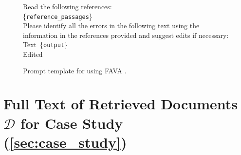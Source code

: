 \begin{figure}[htb!]
    \centering
    \begin{tcolorbox}[colback=gray!10, colframe=black, title=Prompt template for FAVA]
        Read the following references:\\
        \{\texttt{reference\_passages}\} \\
        Please identify all the errors in the following text using the information in the references provided and suggest edits if necessary:\\
        \lbrack Text\rbrack\ \{\texttt{output}\}\\
        \lbrack Edited\rbrack\ 
    \end{tcolorbox}
    \vspace{-3mm}
    
    \caption{Prompt template for using FAVA \cite{mishra2024finegrained-FAVA}.}
    \label{fig:FAVA_Prompt}
\end{figure}



\onecolumn
\section{Full Text of Retrieved Documents \texorpdfstring{$\mathcal{D}$}{D} for Case Study\texorpdfstring{ (\cref{sec:case_study})}{}}
\label{sec:appendix_full_documents}

